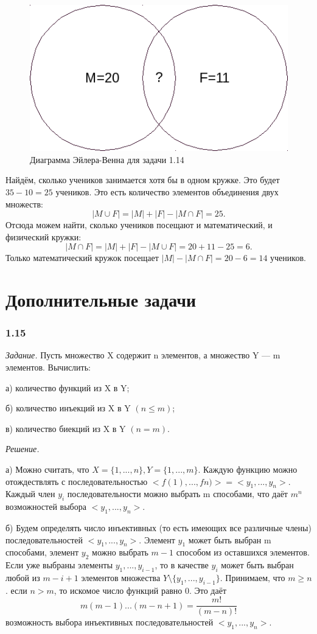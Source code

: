 \documentclass{book}
\begin{document}
\begin{figure}[h!]
  \centering
  \includegraphics[width=.4\textwidth]{./pictures/1_14.png}
  \caption{Диаграмма Эйлера-Венна для задачи 1.14}
  \label{fig:114}
\end{figure}

Найдём, сколько учеников занимается хотя бы в одном кружке. Это будет $35-10=25$ учеников. Это есть количество элементов объединения двух множеств: $$|M\cup F|=|M|+|F|-|M\cap F|=25.$$ Отсюда можем найти, сколько учеников посещают и математический, и физический кружки: $$|M\cap F|=|M|+|F|-|M\cup F|=20+11-25=6.$$ Только математический кружок посещает $|M|-|M\cap F|=20-6=14$ учеников.

\section*{Дополнительные задачи}

\subsubsection*{1.15}

\textit{Задание.} Пусть множество X содержит n элементов, а множество Y --- m элементов. Вычислить:

а) количество функций из X в Y;

б) количество инъекций из X в Y $\left(n\leq m\right)$;

в) количество биекций из X в Y $\left(n=m\right)$.

\textit{Решение.}

а) Можно считать, что $X=\{1, ..., n\}, Y=\{1, ..., m\}$. Каждую функцию можно отождествлять с последовательностью $<f(1), ..., fn)>=<y_1, ..., y_n>$. Каждый член $y_i$ последовательности можно выбрать m способами, что даёт $m^n$ возможностей выбора $<y_1, ..., y_n>$.

б) Будем определять число инъективных (то есть имеющих все различные члены) последовательностей $<y_1, ..., y_n>$. Элемент $y_1$ может быть выбран m способами, элемент $y_2$ можно выбрать $m-1$ способом из оставшихся элементов. Если уже выбраны элементы $y_1, ..., y_{i-1}$, то в качестве $y_i$ может быть выбран любой из $m-i+1$ элементов множества $Y\setminus\{y_1, ..., y_{i-1}\}$. Принимаем, что $m\geq n$. если $n>m$, то искомое число функций равно 0. Это даёт $$m\left(m-1\right)...\left(m-n+1\right)=\frac{m!}{\left(m-n\right)!}$$ возможность выбора инъективных последовательностей $<y_1, ..., y_n>$.
\end{document}

